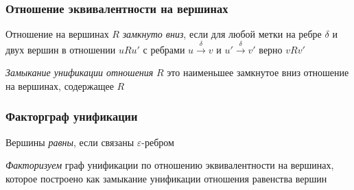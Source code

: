 \documentclass{beamer}
\begin{document}
\begin{frame}[fragile]
  \frametitle{Отношение эквивалентности на вершинах}
Отношение на вершинах $R$ \textit{замкнуто вниз}, если для любой метки на ребре $\delta$ и двух вершин в отношении $uRu'$ с ребрами $u \xrightarrow{\delta} v$ и $u' \xrightarrow{\delta} v'$ верно $vRv'$

\begin{center}
\end{center}

\bigskip

\textit{Замыкание унификации отношения} $R$ это наименьшее замкнутое вниз отношение на вершинах, содержащее $R$
\end{frame}

\begin{frame}[fragile]
  \frametitle{Факторграф унификации}
Вершины \textit{равны}, если связаны $\varepsilon$-ребром

\bigskip

\textit{Факторизуем} граф унификации по отношению эквивалентности на вершинах, которое построено как замыкание унификации отношения равенства вершин

\pause

\begin{center}
  
\end{center}


\end{frame}
\end{document}
